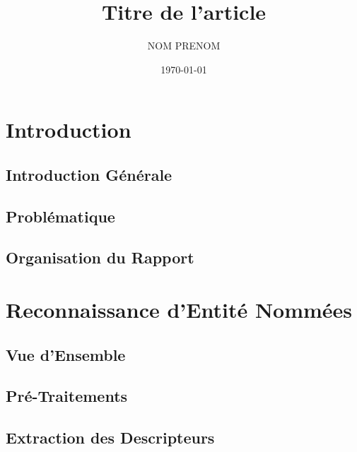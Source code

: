 \documentclass[11pt,a4paper]{report}
\title{Titre de l'article}
\date{\today}
\author{NOM PRENOM}
\begin{document}



%	

%	


\tableofcontents
%	



\chapter{Introduction}
	\section{Introduction Générale}
		
	\section{Problématique}
		
	\section{Organisation du Rapport}
		

  	
\chapter{Reconnaissance d'Entité Nommées}
	\section{Vue d'Ensemble}
		
	\section{Pré-Traitements}
	\section{Extraction des Descripteurs}
\end{document}
